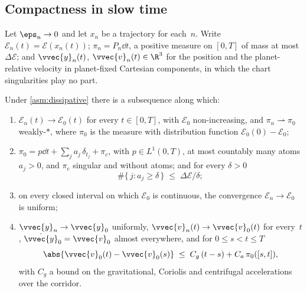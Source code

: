 \subsection{Compactness in slow time}\label{sec:time-slow}

Let $\eps_n\to 0$ and let $x_n$ be a trajectory for each~$n$. Write
$\mathcal{E}_n(t) = \mathcal{E}(x_n(t))$; $\pi_n = P_n\dd t$, a positive
measure on $[0,T]$ of mass at most $\Delta\mathcal{E}$; and
$\vvec{y}_n(t)$, $\vvec{v}_n(t)\in\R^3$ for the position and the
planet-relative velocity in planet-fixed Cartesian components, in which the
chart singularities play no part.

\begin{prop}\label{prop:slow}
Under \cref{asm:dissipative} there is a subsequence along which:
\begin{enumerate}[label=(\roman*),leftmargin=*,itemsep=2pt]
  \item $\mathcal{E}_n(t)\to\mathcal{E}_0(t)$ for every $t\in[0,T]$, with
    $\mathcal{E}_0$ non-increasing, and $\pi_n\rightharpoonup\pi_0$
    weakly-$*$, where $\pi_0$ is the measure with distribution function
    $\mathcal{E}_0(0)-\mathcal{E}_0$;
  \item $\pi_0 = p\dd t + \sum_j a_j\,\delta_{t_j} + \pi_c$, with
    $p\in L^1(0,T)$, at most countably many atoms $a_j>0$, and $\pi_c$
    singular and without atoms; and for every $\delta>0$
    \[
      \#\{\,j : a_j \ge \delta\,\} \;\le\; \Delta\mathcal{E}/\delta ;
    \]
  \item on every closed interval on which $\mathcal{E}_0$ is continuous,
    the convergence $\mathcal{E}_n\to\mathcal{E}_0$ is uniform;
  \item $\vvec{y}_n\to\vvec{y}_0$ uniformly, $\vvec{v}_n(t)\to\vvec{v}_0(t)$
    for every~$t$, $\dot{\vvec{y}}_0 = \vvec{v}_0$ almost everywhere, and
    for $0\le s<t\le T$
    \begin{equation}\label{eq:bv}
      \abs{\vvec{v}_0(t) - \vvec{v}_0(s)}
      \;\le\; C_g\,(t-s) + C_a\,\pi_0([s,t]) ,
    \end{equation}
    with $C_g$ a bound on the gravitational, Coriolis and centrifugal
    accelerations over the corridor.
\end{enumerate}
\end{prop}

